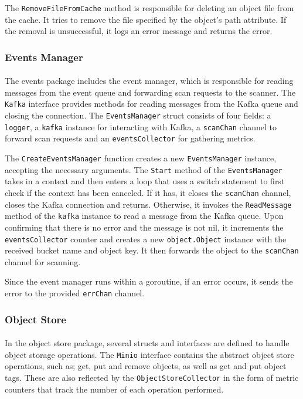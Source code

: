 \documentclass[12pt, conference, final, a4paper, onecolumn, compsoc]{IEEEtran}
\begin{document}
The \texttt{RemoveFileFromCache} method is responsible for deleting an object
file from the cache. It tries to remove the file specified by the object's path
attribute. If the removal is unsuccessful, it logs an error message and returns
the error.

\subsubsection*{Events Manager}
\paragraph{}
The events package includes the event manager, which is responsible for reading
messages from the event queue and forwarding scan requests to the scanner. The
\texttt{Kafka} interface provides methods for reading messages from the Kafka
queue and closing the connection. The \texttt{EventsManager} struct consists of
four fields: a \texttt{logger}, a \texttt{kafka} instance for interacting with
Kafka, a \texttt{scanChan} channel to forward scan requests and an
\texttt{eventsCollector} for gathering metrics.

The \texttt{CreateEventsManager} function creates a new \texttt{EventsManager}
instance, accepting the necessary arguments. The \texttt{Start} method of the
\texttt{EventsManager} takes in a context and then enters a loop that uses a
switch statement to first check if the context has been canceled. If it has, it
closes the \texttt{scanChan} channel, closes the Kafka connection and returns.
Otherwise, it invokes the \texttt{ReadMessage} method of the \texttt{kafka}
instance to read a message from the Kafka queue. Upon confirming that there is
no error and the message is not nil, it increments the \texttt{eventsCollector}
counter and creates a new \texttt{object.Object} instance with the received
bucket name and object key. It then forwards the object to the \texttt{scanChan}
channel for scanning.

Since the event manager runs within a goroutine, if an error occurs, it sends
the error to the provided \texttt{errChan} channel.

\subsubsection*{Object Store}
\paragraph{}
In the object store package, several structs and interfaces are defined to
handle object storage operations. The \texttt{Minio} interface contains the
abstract object store operations, such as; get, put and remove objects, as well
as get and put object tags. These are also reflected by the
\texttt{ObjectStoreCollector} in the form of metric counters that track the
number of each operation performed.
\end{document}
